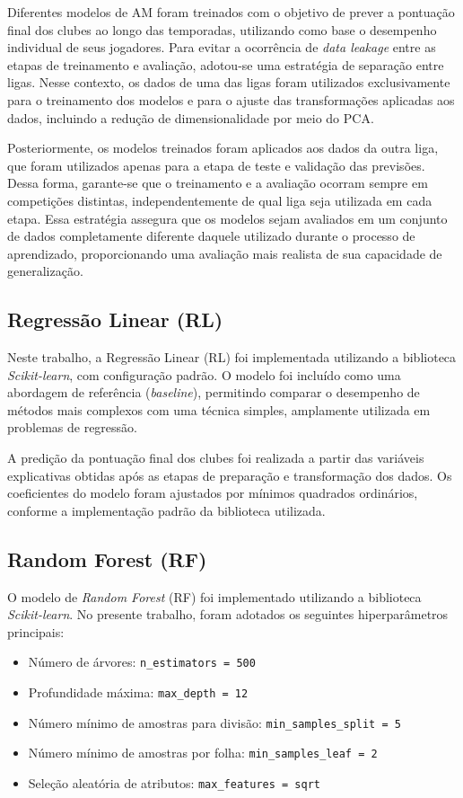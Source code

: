 Diferentes modelos de AM foram treinados com o objetivo de prever a pontuação final dos clubes ao longo das temporadas, utilizando como base o 
desempenho individual de seus jogadores. Para evitar a ocorrência de \textit{data leakage} entre as etapas de treinamento e avaliação, adotou-se uma estratégia de 
separação entre ligas. Nesse contexto, os dados de uma das ligas foram utilizados exclusivamente para o treinamento dos modelos e para o ajuste das transformações 
aplicadas aos dados, incluindo a redução de dimensionalidade por meio do PCA.

Posteriormente, os modelos treinados foram aplicados aos dados da outra liga, que foram utilizados apenas para a etapa de teste e validação das previsões. Dessa forma, 
garante-se que o treinamento e a avaliação ocorram sempre em competições distintas, independentemente de qual liga seja utilizada em cada etapa. Essa estratégia 
assegura que os modelos sejam avaliados em um conjunto de dados completamente diferente daquele utilizado durante o processo de aprendizado, proporcionando uma 
avaliação mais realista de sua capacidade de generalização.

\subsection{Regressão Linear (RL)}

Neste trabalho, a Regressão Linear (RL) foi implementada utilizando a biblioteca \textit{Scikit-learn}, com configuração padrão. 
O modelo foi incluído como uma abordagem de referência (\textit{baseline}), permitindo comparar o desempenho de métodos mais complexos 
com uma técnica simples, amplamente utilizada em problemas de regressão.

A predição da pontuação final dos clubes foi realizada a partir das variáveis explicativas obtidas após as etapas de preparação e transformação dos dados. 
Os coeficientes do modelo foram ajustados por mínimos quadrados ordinários, conforme a implementação padrão da biblioteca utilizada.

\subsection{Random Forest (RF)}

O modelo de \textit{Random Forest} (RF) foi implementado utilizando a biblioteca \textit{Scikit-learn}. 
No presente trabalho, foram adotados os seguintes hiperparâmetros principais:

\begin{itemize}
    \item Número de árvores: \texttt{n\_estimators = 500}
    \item Profundidade máxima: \texttt{max\_depth = 12}
    \item Número mínimo de amostras para divisão: \texttt{min\_samples\_split = 5}
    \item Número mínimo de amostras por folha: \texttt{min\_samples\_leaf = 2}
    \item Seleção aleatória de atributos: \texttt{max\_features = sqrt}
\end{itemize}


